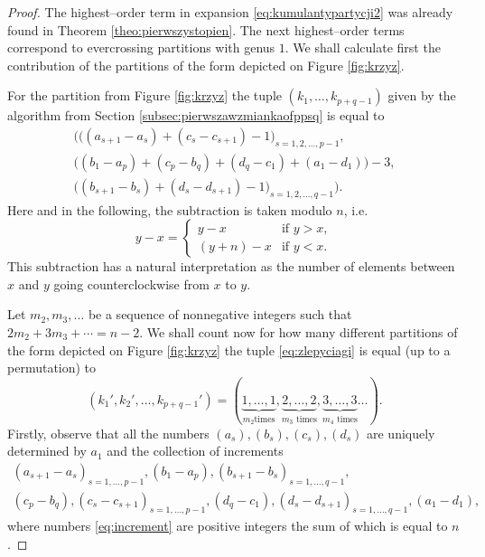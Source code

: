 \documentclass[12pt,dvips]{amsart}
\numberwithin{equation}{section} \numberwithin{figure}{section}
\theoremstyle{plain}
\theoremstyle{definition}
\theoremstyle{remark}
\begin{document}
\begin{proof}
The highest--order term in expansion \eqref{eq:kumulantypartycji2}
was already found in Theorem \ref{theo:pierwszystopien}. The next
highest--order terms correspond to evercrossing partitions with
genus $1$. We shall calculate first the contribution of the
partitions of the form depicted on Figure \ref{fig:krzyz}.

For the partition from Figure \ref{fig:krzyz} the tuple
$(k_1,\dots,k_{p+q-1})$ given by the algorithm from Section
\ref{subsec:pierwszawzmiankaofppsq} is equal to
\begin{multline}
\label{eq:zlepyciagi}
\Big( \big( (a_{s+1}-a_{s})+(c_s-c_{s+1})-1 \big)_{s=1,2,\dots,p-1},\\
\big((b_1-a_p)+(c_p-b_q)+(d_q-c_1)+(a_1-d_1)\big)-3, \\
\big( (b_{s+1}-b_{s})+(d_s-d_{s+1})-1 \big)_{s=1,2,\dots,q-1} \Big).
\end{multline}
Here and in the following, the subtraction is taken modulo $n$, i.e.
$$y-x=\begin{cases} y-x & \text{if } y>x, \\ (y+n)-x & \text{if } y<x. \end{cases}$$
This subtraction has a natural interpretation as the number of
elements between $x$ and $y$ going counterclockwise from $x$ to $y$.

Let $m_2,m_3,\dots$ be a sequence of nonnegative integers such that
$2 m_2+3 m_3+\cdots=n-2$. We shall  count now for how many different
partitions of the form depicted on Figure \ref{fig:krzyz} the tuple
\eqref{eq:zlepyciagi} is equal (up to a permutation) to
\begin{equation}
\label{eq:gromada}
(k_1',k_2',\dots,k_{p+q-1}')=(\underbrace{1,\dots,1}_{m_2\text{
times}}, \underbrace{2,\dots,2}_{m_3\text{ times}},
\underbrace{3,\dots,3}_{m_4\text{ times}}\dots).
\end{equation}
Firstly, observe that all the numbers $(a_s),(b_s),(c_s),(d_s)$ are
uniquely determined by $a_1$ and the collection of increments
\begin{multline}
\label{eq:increment} (a_{s+1}-a_s)_{s=1,\dots,p-1} , (b_1-a_p),
(b_{s+1}-b_s)_{s=1,\dots,q-1},\\  (c_p-b_q),
(c_s-c_{s+1})_{s=1,\dots,p-1},
              (d_q-c_1) , (d_s-d_{s+1})_{s=1,\dots,q-1}, (a_1-d_1),
\end{multline}
where numbers \eqref{eq:increment} are positive integers the sum of
which is equal to $n$.


\end{proof}
\end{document}

